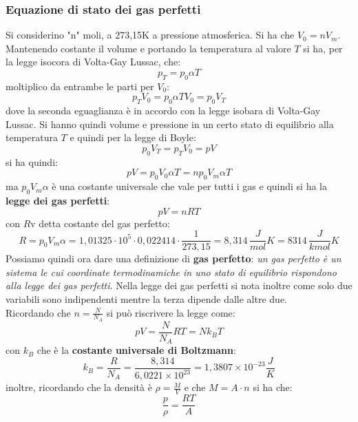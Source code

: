 \documentclass[a4paper,12pt, oneside]{book}
\begin{document}
\subsubsection{Equazione di stato dei gas perfetti}
Si considerino "n" moli, a 273,15K a pressione atmosferica. Si ha che $V_0=nV_m$. Mantenendo costante il volume e portando la temperatura al valore $T$ si ha, per la legge isocora di Volta-Gay Lussac, che:
$$p_T=p_0\alpha T$$
moltiplico da entrambe le parti per $V_0$:
$$p_TV_0=p_0\alpha TV_0=p_0V_T$$
dove la seconda eguaglianza è in accordo con la legge isobara di Volta-Gay Lussac. Si hanno quindi volume e pressione in un certo stato di equilibrio alla temperatura $T$ e quindi per la legge di Boyle:
$$p_0V_T=p_TV_0=pV$$
si ha quindi:
$$pV=p_0V_0\alpha T=np_0V_m\alpha T$$
ma $p_0V_m\alpha$ è una costante universale che vale per tutti i gas e quindi si ha la \textbf{legge dei gas perfetti}:
$$pV=nRT$$
con $R$v detta costante del gas perfetto: 
$$R=p_0V_m\alpha=1,01325\cdot 10^5\cdot 0,022414\cdot \frac{1}{273,15}=8,314\,\frac{J}{mol}K=8314\,\frac{J}{kmol}K$$
Possiamo quindi ora dare una definizione di \textbf{gas perfetto}: \textit{un gas perfetto è un sistema le cui coordinate termodinamiche in uno stato di equilibrio rispondono alla legge dei gas perfetti}. Nella legge dei gas perfetti si nota inoltre come solo due variabili sono indipendenti mentre la terza dipende dalle altre due.\\
Ricordando che $n=\frac{N}{N_A}$ si può riscrivere la legge come:
$$pV=\frac{N}{N_A}RT=Nk_BT$$
con $k_B$ che è la \textbf{costante universale di Boltzmann}:
$$k_B=\frac{R}{N_A}=\frac{8,314}{6,0221\times 10^{23}}=1,3807\times 10^{-23}\frac{J}{K}$$
inoltre, ricordando che la densità è $\rho=\frac{M}{V}$ e che $M=A\cdot n$ si ha che:
$$\frac{p}{\rho}=\frac{RT}{A}$$
\end{document}
